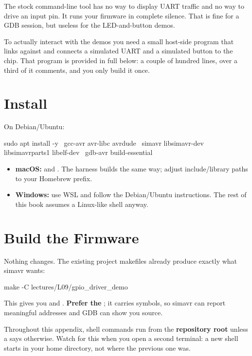 The stock  command-line tool has no way to display UART traffic and no way to drive an
input pin. It runs your firmware in complete silence. That is fine for a GDB session, but useless
for the LED-and-button demos.

To actually interact with the demos you need a small host-side program that links against
 and connects a simulated UART and a simulated button to the chip. That program is
provided in full below: a couple of hundred lines, over a third of it comments, and you only build
it once.

\section{Install}
\label{sim:sec:install}
On Debian/Ubuntu:

\begin{shell}
sudo apt install -y \
    gcc-avr avr-libc avrdude \
    simavr libsimavr-dev libsimavrparts1 libelf-dev \
    gdb-avr build-essential
\end{shell}

\begin{itemize}
  \item \textbf{macOS:}  and .
    The harness builds the same way; adjust include/library paths to your Homebrew prefix.
  \item \textbf{Windows:} use WSL and follow the Debian/Ubuntu instructions. The rest of this book
    assumes a Linux-like shell anyway.
\end{itemize}

\section{Build the Firmware}
\label{sim:sec:build}
Nothing changes. The existing project makefiles already produce exactly what simavr wants:

\begin{shell}
make -C lectures/L09/gpio_driver_demo
\end{shell}

\noindent This gives you  and . \textbf{Prefer the }; it
carries symbols, so simavr can report meaningful addresses and GDB can show you source.

Throughout this appendix, shell commands run from the \textbf{repository root} unless a \code{cd}
says otherwise. Watch for this when you open a second terminal: a new shell starts in your home
directory, not where the previous one was.

